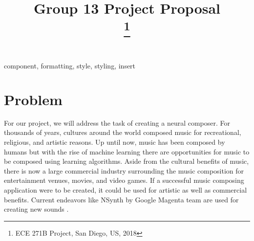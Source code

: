 \documentclass[conference]{IEEEtran}
\begin{document}
\title{Group 13 Project Proposal\\
\thanks{ECE 271B Project, San Diego, US, 2018}
}

\author{
\and
{}
\and
{}
\and
{}
\and
{}
}

\maketitle


\begin{IEEEkeywords}
component, formatting, style, styling, insert
\end{IEEEkeywords}

\section{Problem}
For our project, we will address the task of creating a neural composer. For thousands of years, cultures around the world composed music for recreational, religious, and artistic reasons. Up until now, music has been composed by humans but with the rise of machine learning there are opportunities for music to be composed using learning algorithms. Aside from the cultural benefits of music, there is now a large commercial industry surrounding the music composition for entertainment venues, movies, and video games. If a successful music composing application were to be created, it could be used for artistic as well as commercial benefits. Current endeavors like NSynth by Google Magenta team are used for creating new sounds \cite{NSynth}.
\end{document}
